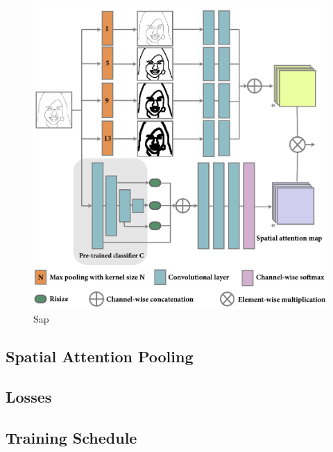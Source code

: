 \begin{figure}
	\includegraphics[width=\columnwidth]{figs/sap}
	\caption{Sap}
	\label{fig:sap}
\end{figure}


\subsection{Spatial Attention Pooling}
\label{subsec:algorithm_sap}




\subsection{Losses}
\label{subsec:algorithm_loss}


\subsection{Training Schedule}
\label{subsec:algorithm_training}

